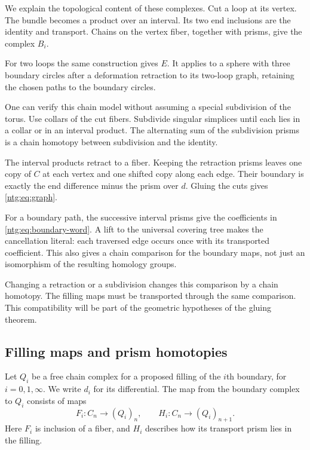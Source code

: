 We explain the topological content of these complexes. Cut a loop at
its vertex. The bundle becomes a product over an interval. Its two end
inclusions are the identity and transport. Chains on the vertex fiber,
together with prisms, give the complex $B_i$.

For two loops the same
construction gives $E$. It applies to a sphere with three boundary
circles after a deformation retraction to its two-loop graph, retaining
the chosen paths to the boundary circles.

One can verify this chain model without assuming a special subdivision
of the torus. Use collars of the cut fibers. Subdivide singular simplices
until each lies in a collar or in an interval product. The alternating
sum of the subdivision prisms is a chain homotopy between subdivision
and the identity.

The interval products retract to a fiber. Keeping the
retraction prisms leaves one copy of $C$ at each vertex and one shifted
copy along each edge. Their boundary is exactly the end difference
minus the prism over $d$. Gluing the cuts gives
\eqref{ntg:eq:graph}.

For a boundary path, the successive interval prisms
give the coefficients in \eqref{ntg:eq:boundary-word}. A lift to the
universal covering tree makes the cancellation literal: each traversed
edge occurs once with its transported coefficient. This also gives a
chain comparison for the boundary maps, not just an isomorphism of
the resulting homology groups.

Changing a retraction or a subdivision changes this comparison by a
chain homotopy. The filling maps must be transported through the same
comparison. This compatibility will be part of the geometric
hypotheses of the gluing theorem.

\subsection{Filling maps and prism homotopies}

Let $Q_i$ be a free chain complex for a proposed filling of the $i$th
boundary, for $i=0,1,\infty$. We write $d_i$ for its differential.
The map from the boundary complex to $Q_i$ consists of maps
\begin{equation}\label{ntg:eq:filling-data}
 F_i:C_n\longrightarrow(Q_i)_n,\qquad
 H_i:C_n\longrightarrow(Q_i)_{n+1}.
\end{equation}
Here $F_i$ is inclusion of a fiber, and $H_i$ describes how its
transport prism lies in the filling.

